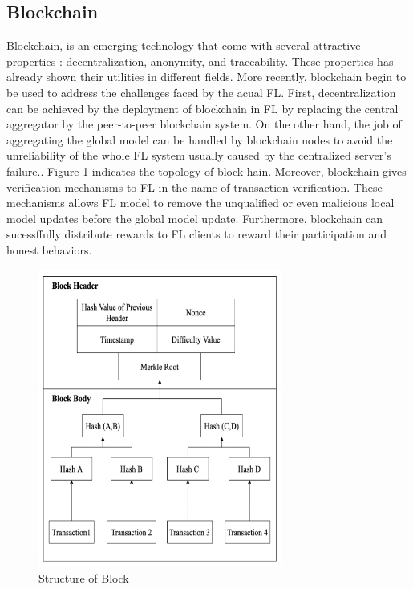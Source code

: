 \documentclass{article}
\begin{document}
\subsection{Blockchain}
Blockchain, is an emerging technology that come with several attractive properties : decentralization, anonymity, and traceability. These properties has already shown their utilities in different fields. More recently, blockchain begin to be used to address the challenges faced by the acual FL. First, decentralization can be achieved by the deployment of blockchain in FL by replacing the central aggregator by the peer-to-peer blockchain system. On the other hand,  the job of aggregating the global model can be handled by blockchain nodes to avoid the unreliability of the whole FL system usually caused by the centralized server's failure.. Figure \ref{fig:TopologyBC} indicates the topology of block hain. Moreover, blockchain gives verification mechanisms to FL in the name of transaction verification. These mechanisms allows FL model to remove the unqualified or even malicious local model updates before the global model update. Furthermore, blockchain can sucessffully distribute rewards to FL clients to reward their participation and honest behaviors.
\begin{figure}[!ht]
    \centering
    \includegraphics[width=8cm]{assets/topologyBC.PNG}
    \caption{Structure of Block}
    \label{fig:TopologyBC}
\end{figure}
\end{document}
